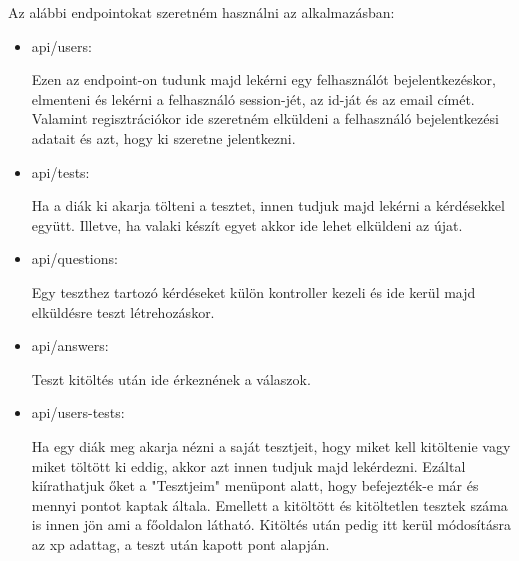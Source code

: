 \label{API}

Az alábbi endpointokat szeretném használni az alkalmazásban:

\begin{itemize}
    \item{api/users:}
          \begin{addmargin}[\parindent]{0pt}
            Ezen az endpoint-on tudunk majd lekérni egy felhasználót bejelentkezéskor, elmenteni és lekérni a felhasználó session-jét, az id-ját és az email címét. Valamint regisztrációkor ide szeretném elküldeni a felhasználó bejelentkezési adatait és azt, hogy ki szeretne jelentkezni.
          \end{addmargin}

    \item{api/tests:}
          \begin{addmargin}[\parindent]{0pt}
            Ha a diák ki akarja tölteni a tesztet, innen tudjuk majd lekérni a kérdésekkel együtt. Illetve, ha valaki készít egyet akkor ide lehet elküldeni az újat.
          \end{addmargin}

    \item {api/questions:}
          \begin{addmargin}[\parindent]{0pt}
            Egy teszthez tartozó kérdéseket külön kontroller kezeli és ide kerül majd elküldésre teszt létrehozáskor.
          \end{addmargin}
          
    \item {api/answers:}
        \begin{addmargin}[\parindent]{0pt}
            Teszt kitöltés után ide érkeznének a válaszok.
        \end{addmargin}
    
    \item {api/users-tests:}
          \begin{addmargin}[\parindent]{0pt}
            Ha egy diák meg akarja nézni a saját tesztjeit, hogy miket kell kitöltenie vagy miket töltött ki eddig, akkor azt innen tudjuk majd lekérdezni. Ezáltal kiírathatjuk őket a "Tesztjeim" menüpont alatt, hogy befejezték-e már és mennyi pontot kaptak általa. Emellett a kitöltött és kitöltetlen tesztek száma is innen jön ami a főoldalon látható. Kitöltés után pedig itt kerül módosításra az xp adattag, a teszt után kapott pont alapján.
          \end{addmargin}
\end{itemize}